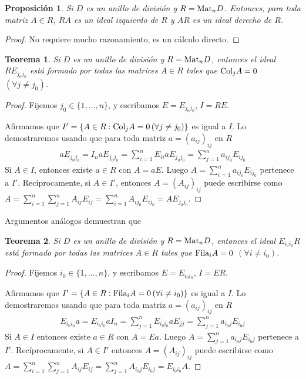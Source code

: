 \documentclass{report}
\newcommand{\Mat}{\textnormal{Mat}}
\newcommand{\Col}{\textnormal{Col}}
\newcommand{\Fila}{\textnormal{Fila}}
\newtheorem{theorem}{Teorema}
\newtheorem{proposition}{Proposición}
\begin{document}
  \begin{proposition}
    Si \(D\) es un anillo de división y \(R = \Mat_n D\).
    Entonces, para toda matriz \(A \in R\), \(R A\) es un ideal izquierdo de \(R\) y \(A R\) es un ideal derecho de \(R\).
  \end{proposition}
  \begin{proof}
    No requiere mucho razonamiento, es un cálculo directo.
  \end{proof}

  \begin{theorem}
    Si \(D\) es un anillo de división y \(R = \Mat_n D\), entonces el ideal \(R E_{j_0 j_0}\) está formado por todas las matrices \(A \in R\) tales que \(\Col_j A = 0\) \((\forall j \neq j_0)\).
  \end{theorem}
  \begin{proof}
    Fijemos \(j_0 \in \{1, \dots, n\}\), y escribamos \(E = E_{j_0 j_0}\), \(I = R E\).

    Afirmamos que \(I' = \{A \in R : \Col_j A = 0 \, (\forall j \neq j_0)\}\) es igual a \(I\).
    Lo demostraremos usando que para toda matriz \(a = (a_{i j})_{i j}\) en \(R\)
    \begin{align}
      a E_{j_0 j_0}
      =
      I_n a E_{j_0 j_0}
      =
      \sum_{i = 1}^n E_{i i} a E_{j_0 j_0}
      =
      \sum_{j = 1}^n a_{i j_0} E_{i j_0}
    \end{align}
    Si \(A \in I\), entonces existe \(a \in R\) con \(A = a E\).
    Luego \(A = \sum_{i = 1}^n a_{i j_0} E_{i j_0}\) pertenece a \(I'\).
    Recíprocamente, si \(A \in I'\), entonces \(A = (A_{i j})_{i j}\) puede escribirse como \(A = \sum_{i = 1}^n \sum_{j = 1}^n A_{i j} E_{i j} = \sum_{i = 1}^n A_{i j_0} E_{i j_0} = A E_{j_0 j_0}\).
  \end{proof}

  Argumentos análogos demuestran que
  \begin{theorem}
    Si \(D\) es un anillo de división y \(R = \Mat_n D\), entonces el ideal \(E_{i_0 i_0} R\) está formado por todas las matrices \(A \in R\) tales que \(\Fila_i A = 0\) \((\forall i \neq i_0)\).
  \end{theorem}
  \begin{proof}
    Fijemos \(i_0 \in \{1, \dots, n\}\), y escribamos \(E = E_{i_0 i_0}\), \(I = E R\).

    Afirmamos que \(I' = \{A \in R : \Fila_i A = 0 \, (\forall i \neq i_0)\}\) es igual a \(I\).
    Lo demostraremos usando que para toda matriz \(a = (a_{i j})_{i j}\) en \(R\)
    \begin{align}
      E_{i_0 i_0} a
      =
      E_{i_0 i_0} a I_n
      =
      \sum_{j = 1}^n E_{i_0 i_0} a E_{j j}
      =
      \sum_{j = 1}^n a_{i_0 j} E_{i_0 j}
    \end{align}
    Si \(A \in I\) entonces existe \(a \in R\) con \(A = E a\).
    Luego \(A = \sum_{j = 1}^n a_{i_0 j} E_{i_0 j}\) pertenece a \(I'\).
    Recíprocamente, si \(A \in I'\) entonces \(A = (A_{i j})_{i j}\) puede escribirse como \(A = \sum_{i = 1}^n \sum_{j = 1}^n A_{i j} E_{i j} = \sum_{j = 1}^n A_{i_0 j} E_{i_0 j} = E_{i_0 i_0} A\).
  \end{proof}
\end{document}
